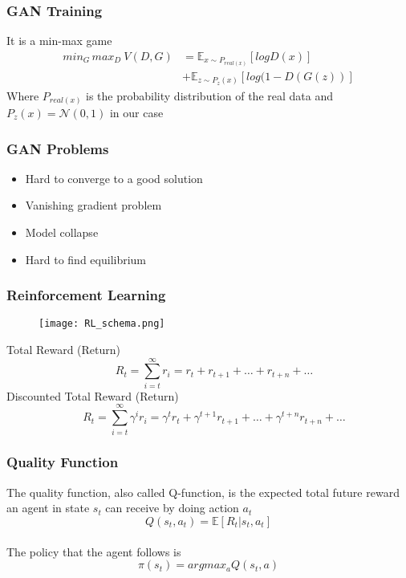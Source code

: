 \documentclass{beamer}
\newcommand\E{\ensuremath{\mathbb{E}}}
\renewcommand\inf{\ensuremath{\infty}}
\begin{document}
\begin{frame}
\frametitle{GAN Training}
It is a min-max game
\begin{align*}
  min_G \, max_D \: V(D,G) &=
    \E_{x \sim P_{real(x)}} [ log D(x) ]
    \\                     &+
    \E_{z \sim P_z(x)} [ log ( 1 - D(G(z)) ]
\end{align*}
Where $P_{real(x)}$ is the probability distribution of the real data and $P_z(x) = \mathcal{N}(0,1)$ in our case

\end{frame}

\begin{frame}
\frametitle{GAN Problems}
\begin{itemize}
  \item Hard to converge to a good solution
  \item Vanishing gradient problem
  \item Model collapse
  \item Hard to find equilibrium
\end{itemize}
\end{frame}



\begin{frame}
\frametitle{Reinforcement Learning}
\begin{figure}[ht]
  \texttt{[image: RL\_schema.png]}
\end{figure}

\textrm{Total Reward (Return)}
$$
\quad R_t = \sum_{i=t}^{\inf} r_i = r_t + r_{t+1} + \dots + r_{t+n} + \dots
$$
\textrm{Discounted Total Reward (Return)}
$$
\quad R_t = \sum_{i=t}^{\inf} \gamma^i r_i = \gamma^t r_t + \gamma^{t+1} r_{t+1} + \dots + \gamma^{t+n} r_{t+n} + \dots
$$

\end{frame}

\begin{frame}
\frametitle{Quality Function}
The quality function, also called Q-function, is the expected total future reward an agent in state $s_t$ can receive by doing action $a_t$
$$
Q(s_t, a_t) = \E [ R_t | s_t, a_t]
$$
\\
The policy that the agent follows is
$$
\pi (s_t) = argmax_a Q(s_t, a)
$$

\end{frame}
\end{document}
